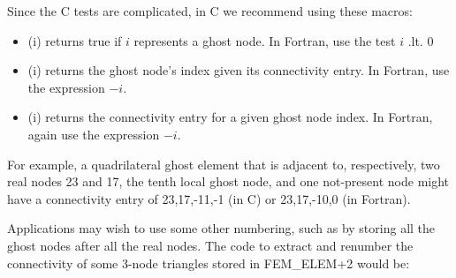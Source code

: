 Since the C tests are complicated, in C we recommend using these macros:

\begin{itemize}
\item {}(i) returns true if $i$ represents a ghost node.
In Fortran, use the test $i$ .lt. $0$

\item {}(i) returns the ghost node's index given its connectivity entry.
In Fortran, use the expression $-i$.

\item {}(i) returns the connectivity entry for a given ghost node index.
In Fortran, again use the expression $-i$.
\end{itemize}

For example, a quadrilateral ghost element that is adjacent to, respectively, two real 
nodes 23 and 17, the tenth local ghost node, and one not-present node might have a 
connectivity entry of {23,17,-11,-1} (in C) or {23,17,-10,0} (in Fortran).

Applications may wish to use some other numbering,
such as by storing all the ghost nodes after all the real nodes.
The code to extract and renumber the connectivity of some 3-node triangles 
stored in FEM\_ELEM+2 would be:

